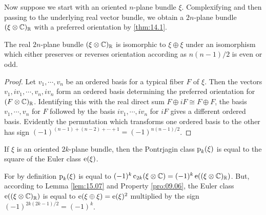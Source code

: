 \documentclass[../main]{subfiles}
\begin{document}
Now suppose we start with an oriented $n$-plane bundle $\xi$. Complexifying and then passing to the underlying real vector bundle, we obtain a $2n$-plane bundle $(\xi \otimes \mathbb C)_\mathbb R$ with a preferred orientation by \ref{thm:14.1}.
\setcounter{theorem}{6}
\begin{lemma}
\label{lem:15.07}
The real $2n$-plane bundle $(\xi \otimes \mathbb C)_\mathbb R$ is isomorphic to $\xi \oplus \xi$ under an isomorphism which either preserves or reverses orientation according as $n(n-1)/2$ is even or odd.
\end{lemma}
\begin{proof}
Let $v_1,\cdots,v_n$ be an ordered basis for a typical fiber $F$ of $\xi$. Then the vectors $v_1,iv_1,\cdots,v_n,iv_n$ form an ordered basis determining the preferred orientation for $(F\otimes \mathbb C)_\mathbb R$. Identifying this with the real direct sum $F \oplus iF \cong F \oplus F$, the basis $v_1,\cdots,v_n$ for $F$ followed by the basis $iv_1,\cdots,iv_n$ for $iF$ gives a different ordered basis. Evidently the permutation which transforms one ordered basis to the other has sign $(-1)^{(n-1) + (n-2) + \cdots + 1} = (-1)^{n(n-1)/2}$.
\end{proof}
\begin{corollary}
\label{cor:15.08}
If $\xi$ is an oriented $2k$-plane bundle, then the Pontrjagin class $\operatorname{p}_k(\xi)$ is equal to the square of the Euler class $\operatorname{e}(\xi)$.
\end{corollary}
For by definition $\operatorname{p}_k(\xi)$ is equal to $(-1)^k \operatorname{c}_{2k}(\xi \otimes \mathbb C) = (-1)^k \operatorname{e}((\xi \otimes \mathbb C)_\mathbb R)$. But, according to Lemma \ref{lem:15.07} and Property \ref{pro:09.06}, the Euler class $\operatorname{e}((\xi \otimes \mathbb C)_\mathbb R)$ is equal to $\operatorname{e}(\xi \oplus \xi) = \operatorname{e}(\xi)^2$ multiplied by the sign $(-1)^{2k(2k-1)/2} = (-1)^k$.
\end{document}
